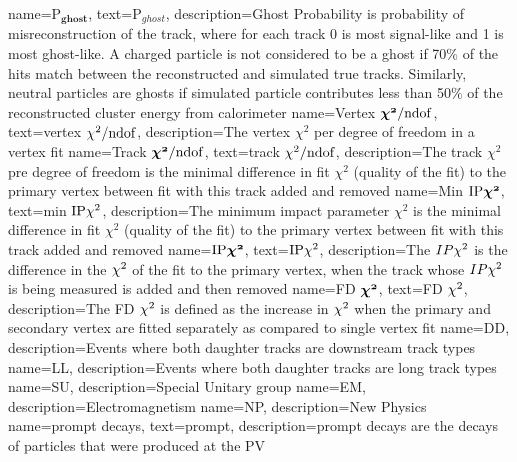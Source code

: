 {
	name=P$\mathbold{_{ghost}}$,%
		text=P$_{ghost}$,
		description={Ghost Probability is probability of misreconstruction of the track, where for each track 0 is most signal-like and 1 is most ghost-like. A charged particle is not considered to be a ghost if 70$\%$ of the hits match between the reconstructed and simulated true tracks. Similarly, neutral particles are ghosts if simulated particle contributes less than 50$\%$ of the reconstructed cluster energy from calorimeter} 
}                
{
	        name={Vertex $\mathbold{\chisq/\rm{ndof}}$},
		text={vertex ${\chi^2/\rm{ndof}}$},
		description={The vertex $\chi^{2}$ per degree of freedom in a vertex fit} %
		}
{
	        name={Track $\mathbold{\chisq/\rm{ndof}}$},
		text={track $\chi^2/\rm{ndof}$},
		description={The track $\chi^{2}$ pre degree of freedom is the minimal difference in fit $\chi^{2}$ (quality of the fit) to the primary vertex between fit with this track added  and removed} %
		}
{
	        name={Min $\mathbold{\mathrm{IP}\chisq}$},
		text={min $\mathrm{IP}\chi^2$},
		description={The minimum impact parameter $\chi^{2}$ is the minimal difference in fit $\chi^{2}$ (quality of the fit) to the primary vertex between fit with this track added  and removed} %
		}
{
	name=$\mathbold{\mathrm{IP}\chisq}$,
		text=$\mathrm{IP}\chi^2$,
		description={The $IP\chi^2$ is the difference in the $\chi^2$ of the fit to the primary vertex, when the track whose $IP\chi^2$ is being measured is added and then removed}
} 
{
	        name=FD $\mathbold{\chisq}$,
		text=FD $\chi^2$,
		description={The \Gls{FD} $\chi^2$ is defined as the increase in $\chi^2$ when the primary and secondary vertex are fitted separately as compared to single vertex fit}
}                
{
	name=DD,
		description={Events where both daughter tracks are downstream track types}
}
{
	name=LL,
		description={Events where both daughter tracks are long track types}
}
{
	name=SU,
		description={Special Unitary group}
}                 
{
	name=EM,
		description={Electromagnetism}
}                 
{
	name=NP,
		description={New Physics}
}
{
	name=prompt decays,
		text=prompt,
		description={prompt decays are the decays of particles that were produced at the \Gls{PV}}
}

